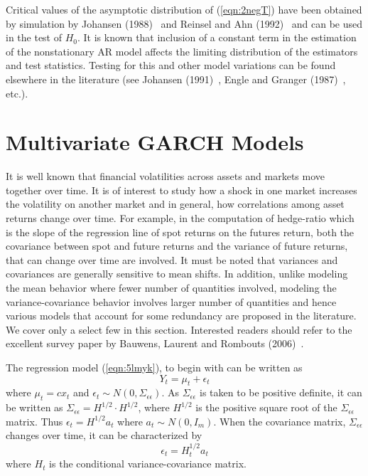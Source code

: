 Critical values of the asymptotic distribution of (\ref{eqn:2negT}) have been obtained by simulation by Johansen (1988)~\cite{johansen1988statistical} and Reinsel and Ahn (1992)~\cite{reinsel1992vector} and can be used in the test of $H_0$. It is known that inclusion of a constant term in the estimation of the nonstationary AR model affects the limiting distribution of the estimators and test statistics. Testing for this and other model variations can be found elsewhere in the literature (see Johansen (1991)~\cite{johansen1991estimation}, Engle and Granger (1987)~\cite{engle1987co}, etc.). 


\section{Multivariate GARCH Models}


It is well known that financial volatilities across assets and markets move together over time. It is of interest to study how a shock in one market increases the volatility on another market and in general, how correlations among asset returns change over time. For example, in the computation of hedge-ratio which is the slope of the regression line of spot returns on the futures return, both the covariance between spot and future returns and the variance of future returns, that can change over time are involved. It must be noted that variances and covariances are generally sensitive to mean shifts. In addition, unlike modeling the mean behavior where fewer number of quantities involved, modeling the variance-covariance behavior involves larger number of quantities and hence various models that account for some redundancy are proposed in the literature. We cover only a select few in this section. Interested readers should refer to the excellent survey paper by Bauwens, Laurent and Rombouts (2006)~\cite{laurent}.


The regression model (\ref{eqn:5lmyk}), to begin with can be written as
	\begin{equation}\label{eqn:3relabel}
	Y_t= \mu_t+\epsilon_t
	\end{equation}
where $\mu_t=cx_t$ and $\epsilon_t \sim N(0,\Sigma_{\epsilon\epsilon})$. As $\Sigma_{\epsilon\epsilon}$ is taken to be positive definite, it can be written as $\Sigma_{\epsilon\epsilon}=H^{1/2} \cdot H^{1/2}$, where $H^{1/2}$ is the positive square root of the $\Sigma_{\epsilon\epsilon}$ matrix. Thus $\epsilon_t=H^{1/2}a_t$ where $a_t \sim N(0,I_m)$. When the covariance matrix, $\Sigma_{\epsilon\epsilon}$ changes over time, it can be characterized by
	\begin{equation}
	\epsilon_t=H^{1/2}_t a_t
	\end{equation}
where $H_t$ is the conditional variance-covariance matrix.


